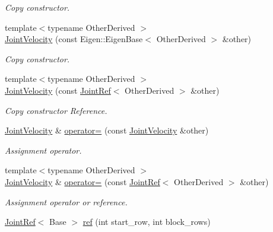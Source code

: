 \begin{DoxyCompactItemize}
\begin{DoxyCompactList}\small\item\em Copy constructor. \end{DoxyCompactList}\item 
{\footnotesize template$<$typename Other\+Derived $>$ }\\\hyperlink{classow__core_1_1JointVelocity_ae94c411048769beee3a1623a4cb3ee91}{Joint\+Velocity} (const Eigen\+::\+Eigen\+Base$<$ Other\+Derived $>$ \&other)
\begin{DoxyCompactList}\small\item\em Copy constructor. \end{DoxyCompactList}\item 
{\footnotesize template$<$typename Other\+Derived $>$ }\\\hyperlink{classow__core_1_1JointVelocity_a40e8b2b99fbfcd1f4ae1deaeb96ee1e6}{Joint\+Velocity} (const \hyperlink{classow__core_1_1JointRef}{Joint\+Ref}$<$ Other\+Derived $>$ \&other)
\begin{DoxyCompactList}\small\item\em Copy constructor Reference. \end{DoxyCompactList}\item 
\hyperlink{classow__core_1_1JointVelocity}{Joint\+Velocity} \& \hyperlink{classow__core_1_1JointVelocity_ab14182510435b5f18347940cbc5e6dbc}{operator=} (const \hyperlink{classow__core_1_1JointVelocity}{Joint\+Velocity} \&other)\hypertarget{classow__core_1_1JointVelocity_ab14182510435b5f18347940cbc5e6dbc}{}\label{classow__core_1_1JointVelocity_ab14182510435b5f18347940cbc5e6dbc}

\begin{DoxyCompactList}\small\item\em Assignment operator. \end{DoxyCompactList}\item 
{\footnotesize template$<$typename Other\+Derived $>$ }\\\hyperlink{classow__core_1_1JointVelocity}{Joint\+Velocity} \& \hyperlink{classow__core_1_1JointVelocity_aa15030ec214e3985cc23dcf5db3b358b}{operator=} (const \hyperlink{classow__core_1_1JointRef}{Joint\+Ref}$<$ Other\+Derived $>$ \&other)\hypertarget{classow__core_1_1JointVelocity_aa15030ec214e3985cc23dcf5db3b358b}{}\label{classow__core_1_1JointVelocity_aa15030ec214e3985cc23dcf5db3b358b}

\begin{DoxyCompactList}\small\item\em Assignment operator or reference. \end{DoxyCompactList}\item 
\hyperlink{classow__core_1_1JointRef}{Joint\+Ref}$<$ Base $>$ \hyperlink{classow__core_1_1JointVelocity_a60273c9e14db0b783b7a659d02efef26}{ref} (int start\+\_\+row, int block\+\_\+rows)\hypertarget{classow__core_1_1JointVelocity_a60273c9e14db0b783b7a659d02efef26}{}\label{classow__core_1_1JointVelocity_a60273c9e14db0b783b7a659d02efef26}


\end{DoxyCompactItemize}
